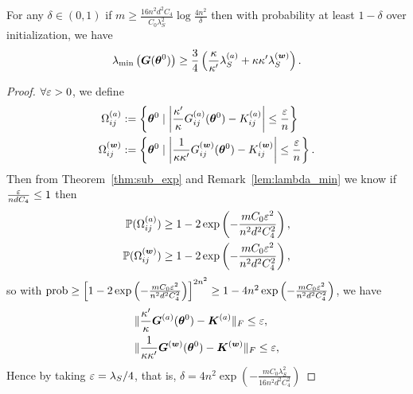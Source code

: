 \documentclass{article}
\begin{document}
\begin{lem}\label{lem:lambda_min}
    For any $\delta\in(0,1)$ if $m\geq\frac{16n^2d^2C_4}{C_0\lambda_S^2}\log\frac{4n^2}{\delta}$ then with probability at least $1-\delta$ over initialization, we have
    \begin{equation}
        \lambda_{\min}\left(\bm{G}(\bm{\theta}^0)\right)\geq\frac{3}{4}\left(\frac{\kappa}{\kappa'}\lambda_S^{(a)}+\kappa\kappa'\lambda_S^{(\bm{w})}\right).
    \end{equation}
\end{lem}
\begin{proof}
    $\forall \varepsilon > 0$, we define
    \begin{equation}
        \begin{aligned}
            \Omega_{ij}^{(a)}   & :=\left\{\bm{\theta}^0 \mid \left\lvert \frac{\kappa'}{\kappa}G^{(a)}_{ij}(\bm{\theta}^0) - K^{(a)}_{ij}\right\rvert \leq \frac{\varepsilon}{n} \right\}        \\
            \Omega_{ij}^{(\bm{w})} & := \left\{\bm{\theta}^0 \mid \left\lvert \frac{1}{\kappa\kappa'}G^{(\bm{w})}_{ij}(\bm{\theta}^0) - K^{(\bm{w})}_{ij}\right\rvert \leq \frac{\varepsilon}{n} \right\}.
        \end{aligned}
    \end{equation}
    Then from Theorem~\ref{thm:sub_exp} and Remark~\ref{lem:lambda_min} we know if $\frac{\varepsilon}{ndC_4}\leq 1$ then
    \begin{equation}
        \begin{aligned}
            \mathbb{P}(\Omega^{(a)}_{ij})   & \geq 1-2\exp\left(-\frac{mC_0\varepsilon^2}{n^2d^2C_4^2}\right), \\
            \mathbb{P}(\Omega^{(\bm{w})}_{ij}) & \geq 1-2\exp\left(-\frac{mC_0\varepsilon^2}{n^2d^2C_4^2}\right),
        \end{aligned}
    \end{equation}
    so with $\mathrm{prob}\geq \left[1-2\exp\left(-\frac{mC_0\varepsilon^2}{n^2d^2C_4^2}\right)\right]^{2n^2} \geq 1-4n^2\exp\left(-\frac{mC_0\varepsilon^2}{n^2d^2C_4^2}\right)$, we have
    \begin{equation}
        \begin{aligned}
             & \lVert\frac{\kappa'}{\kappa}\bm{G}^{(a)}(\bm{\theta}^0) - \bm{K}^{(a)}\rVert_F \leq \varepsilon,      \\
             & \lVert\frac{1}{\kappa\kappa'}\bm{G}^{(\bm{w})}(\bm{\theta}^0) - \bm{K}^{(\bm{w})}\rVert_F \leq \varepsilon,
        \end{aligned}
    \end{equation}
    Hence by taking $\varepsilon=\lambda_S/4$, that is, $\delta=4n^2\exp\left(-\frac{mC_0\lambda_S^2}{16n^2d^2C_4^2}\right)$

\end{proof}
\end{document}
